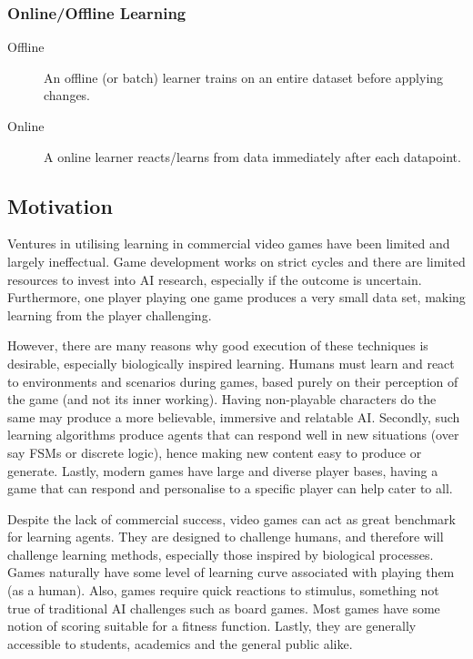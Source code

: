 \subsubsection{Online/Offline Learning}
\begin{description}
	\item[Offline] An offline (or batch) learner trains on an entire dataset before applying changes. 
	\item[Online] A online learner reacts/learns from data immediately after each datapoint.
\end{description} 


\subsection{Motivation}

Ventures in utilising learning in commercial video games have been limited and largely ineffectual. Game development works on strict cycles and there are limited resources to invest into AI research, especially if the outcome is uncertain. Furthermore, one player playing one game produces a very small data set, making learning from the player challenging. \cite{evolutioningamedesign}

However, there are many reasons why good execution of these techniques is desirable, especially biologically inspired learning. Humans must learn and react to environments and scenarios during games, based purely on their perception of the game (and not its inner working). Having non-playable characters do the same may produce a more believable, immersive and relatable AI. Secondly, such learning algorithms produce agents that can respond well in new situations (over say FSMs or discrete logic), hence making new content easy to produce or generate. Lastly, modern games have large and diverse player bases, having a game that can respond and personalise to a specific player can help cater to all. \cite[p.~7, p.~13]{panorama}

Despite the lack of commercial success, video games can act as great benchmark for learning agents. They are designed to challenge humans, and therefore will challenge learning methods, especially those inspired by biological processes. Games naturally have some level of learning curve associated with playing them (as a human). Also, games require quick reactions to stimulus, something not true of traditional AI challenges such as board games. Most games have some notion of scoring suitable for a fitness function. Lastly, they are generally accessible to students, academics and the general public alike. \cite[p.~9]{panorama} \cite[p.~1]{marioaicomp} \cite[p.~2]{2012the}

